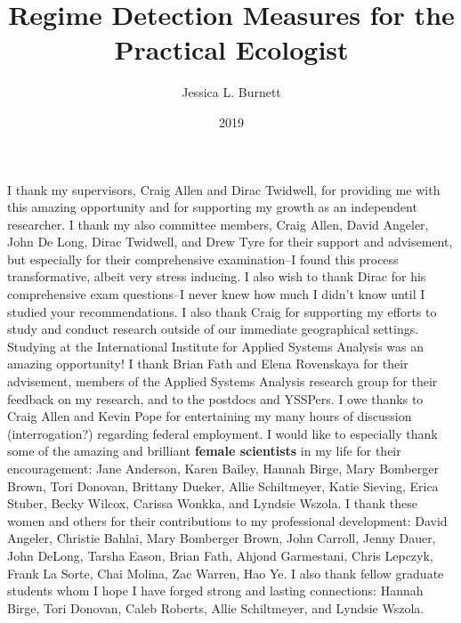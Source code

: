 \documentclass[12pt,twoside,openany]{reedthesis}
\title{Regime Detection Measures for the Practical Ecologist}
\author{Jessica L. Burnett}
\date{2019}
\begin{document}
  \maketitle

\frontmatter %
\pagestyle{empty} %

I thank my supervisors, Craig Allen and Dirac Twidwell, for providing me with this amazing opportunity and for supporting my growth as an independent researcher. I thank my also committee members, Craig Allen, David Angeler, John De Long, Dirac Twidwell, and Drew Tyre for their support and advisement, but especially for their comprehensive examination--I found this process transformative, albeit very stress inducing. I also wish to thank Dirac for his comprehensive exam questions--I never knew how much I didn't know until I studied your recommendations. I also thank Craig for supporting my efforts to study and conduct research outside of our immediate geographical settings. Studying at the International Institute for Applied Systems Analysis was an amazing opportunity! I thank Brian Fath and Elena Rovenskaya for their advisement, members of the Applied Systems Analysis research group for their feedback on my research, and to the postdocs and YSSPers. I owe thanks to Craig Allen and Kevin Pope for entertaining my many hours of discussion (interrogation?) regarding federal employment.
I would like to especially thank some of the amazing and brilliant \textbf{female scientists} in my life for their encouragement: Jane Anderson, Karen Bailey, Hannah Birge, Mary Bomberger Brown, Tori Donovan, Brittany Dueker, Allie Schiltmeyer, Katie Sieving, Erica Stuber, Becky Wilcox, Carissa Wonkka, and Lyndsie Wszola. I thank these women and others for their contributions to my professional development: David Angeler, Christie Bahlai, Mary Bomberger Brown, John Carroll, Jenny Dauer, John DeLong, Tarsha Eason, Brian Fath, Ahjond Garmestani, Chris Lepczyk, Frank La Sorte, Chai Molina, Zac Warren, Hao Ye. I also thank fellow graduate students whom I hope I have forged strong and lasting connections: Hannah Birge, Tori Donovan, Caleb Roberts, Allie Schiltmeyer, and Lyndsie Wszola.
\end{document}
